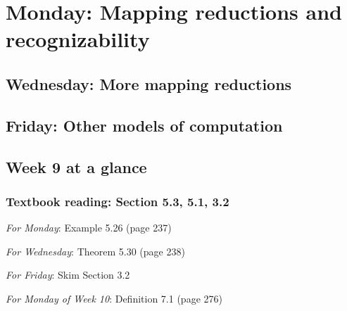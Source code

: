 


\section*{Monday: Mapping reductions and recognizability}


    
\newpage
\subsection*{Wednesday: More mapping reductions}




\newpage
\subsection*{Friday: Other models of computation}



\newpage

\subsection*{Week 9 at a glance}

\subsubsection*{Textbook reading: Section 5.3, 5.1, 3.2}

{\it For Monday}: Example 5.26 (page 237)

{\it For Wednesday}: Theorem 5.30 (page 238)

{\it For Friday}: Skim Section 3.2

{\it For Monday of Week 10}: Definition 7.1 (page 276)

